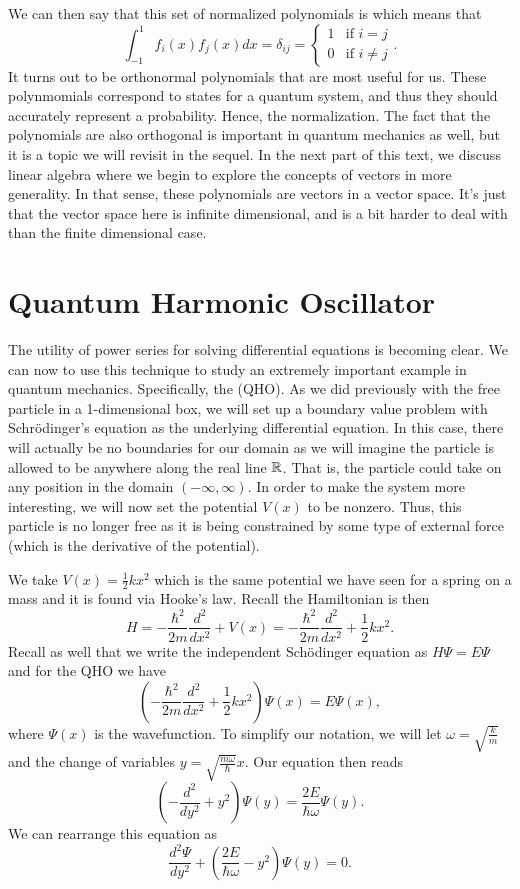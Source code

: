 We can then say that this set of normalized polynomials is  which means that
\[
\int_{-1}^1 f_i(x)f_j(x)dx = \delta_{ij} = \begin{cases} 1 & \textrm{if $i=j$}\\ 0 & \textrm{if $i\neq j$}\end{cases}.
\]
It turns out to be orthonormal polynomials that are most useful for us.  These polynmomials correspond to states for a quantum system, and thus they should accurately represent a probability. Hence, the normalization.  The fact that the polynomials are also orthogonal is important in quantum mechanics as well, but it is a topic we will revisit in the sequel. In the next part of this text, we discuss linear algebra where we begin to explore the concepts of vectors in more generality.  In that sense, these polynomials are vectors in a vector space.  It's just that the vector space here is infinite dimensional, and is a bit harder to deal with than the finite dimensional case.

\section{Quantum Harmonic Oscillator}

The utility of power series for solving differential equations is becoming clear. We can now to use this technique to study an extremely important example in quantum mechanics.  Specifically, the   (QHO).  As we did previously with the free particle in a 1-dimensional box, we will set up a boundary value problem with Schr\"odinger's equation as the underlying differential equation.  In this case, there will actually be no boundaries for our domain as we will imagine the particle is allowed to be anywhere along the real line $\mathbb{R}$.  That is, the particle could take on any position in the domain $(-\infty,\infty)$.  In order to make the system more interesting, we will now set the potential $V(x)$ to be nonzero.  Thus, this particle is no longer free as it is being constrained by some type of external force (which is the derivative of the potential).

We take $V(x)=\frac{1}{2}kx^2$ which is the same potential we have seen for a spring on a mass and it is found via Hooke's law.  Recall the Hamiltonian is then
\[
H = -\frac{\hbar^2}{2m} \frac{d^2}{dx^2} + V(x) = -\frac{\hbar^2}{2m} \frac{d^2}{dx^2} + \frac{1}{2}kx^2.
\]
Recall as well that we write the independent Sch\"odinger equation as $H\Psi = E\Psi$ and for the QHO we have
\begin{equation}
\label{eq:qho}
\left(-\frac{\hbar^2}{2m} \frac{d^2}{dx^2} + \frac{1}{2}kx^2\right)\Psi(x) = E \Psi(x),
\end{equation}
where $\Psi(x)$ is the wavefunction. To simplify our notation, we will let $\omega = \sqrt{\frac{k}{m}}$ and the change of variables $y=\sqrt{\frac{m \omega}{\hbar}}x$.  Our equation then reads
\[
\left(-\frac{d^2}{dy^2} + y^2\right) \Psi(y) = \frac{2E}{\hbar \omega}\Psi(y).
\]
We can rearrange this equation as
\[
\frac{d^2 \Psi}{dy^2} + \left(\frac{2E}{\hbar \omega} - y^2\right)\Psi(y)=0.
\]


